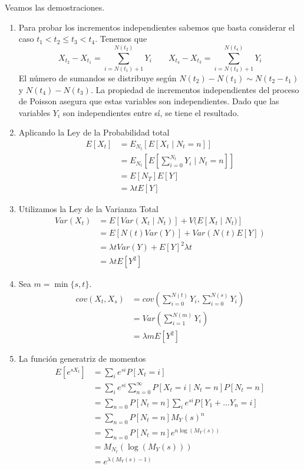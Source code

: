 \documentclass[PREyA.tex]{subfiles}
\begin{document}
\begin{dem}
Veamos las demostraciones.
\begin{enumerate}
\item Para probar los incrementos independientes sabemos que basta considerar el caso $t_1<t_2\leq t_3 <t_4$. Tenemos que
$$
X_{t_2}-X_{t_1} = \sum_{i=N(t_1)+1}^{N(t_2)} Y_i \qquad X_{t_4}-X_{t_3} = \sum_{i=N(t_3)+1}^{N(t_4)} Y_i
$$
El número de sumandos se distribuye según $N(t_2)-N(t_1) \sim N(t_2-t_1)$ y $N(t_4)-N(t_3)$. La propiedad de incrementos independientes del proceso de Poisson asegura que estas variables son independientes. Dado que las variables $Y_i$ son independientes entre sí, se tiene el resultado.
\item Aplicando la Ley de la Probabilidad total
\begin{align*}
E[X_t] &= E_{N_t}\left[E\left[ X_t \mid N_t = n\right]\right] \\
&=E_{N_t}\left[E\left[\sum_{i=0}^{N_t} Y_i \mid N_t = n\right]\right]\\
&=E[N_T]E[Y]\\
&=\lambda tE[Y]
\end{align*}		
\item Utilizamos la Ley de la Varianza Total
\begin{align*}
Var(X_t) &= E[Var(X_t\mid N_t)]+V(E[X_t\mid N_t)]\\
&=E[N(t)Var(Y)]+Var(N(t)E[Y])\\
&=\lambda t Var(Y)+ E[Y]^2 \lambda t\\
&=\lambda t E[Y^2]
\end{align*}
\item Sea $m=\min\{s,t\}$.
\begin{align*}
cov(X_t,X_s)&=cov\left(\sum_{i=0}^{N(t)} Y_i,\sum_{i=0}^{N(s)} Y_i\right)\\
&= Var\left(\sum_{i=1}^{N(m)} Y_i\right)\\
&=\lambda m E[Y^2] 
\end{align*}
\item La función generatriz de momentos
\begin{align*}
E[e^{sX_t}] &=\sum_i e^{si}P[X_t = i]\\
&=\sum_i e^{si}\sum_{n=0}^\infty P[X_t = i\mid N_t =n ] P[N_t = n]\\
&=\sum_{n=0} P[N_t=n]\sum_i  e^{si} P[Y_1+ \dotsc Y_n = i ]\\
&=\sum_{n=0} P[N_t=n] M_Y(s)^n\\
&= \sum_{n=0} P[N_t=n]e^{n\log(M_Y(s))} \\
&= M_{N_t}(\log(M_Y(s)))\\
&=e^{\lambda(M_Y(s)-1)}
\end{align*}

\end{enumerate}
\end{dem}
\end{document}
